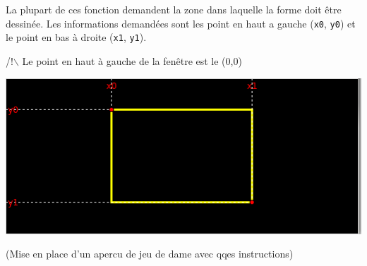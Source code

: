 \documentclass{article}
\begin{document}
La plupart de ces fonction demandent la zone dans laquelle la forme doit être dessinée. Les informations demandées sont les point en haut a gauche (\verb~x0~, \verb~y0~) et le point en bas à droite (\verb~x1~, \verb~y1~).

\noindent
/!$\backslash$ Le point en haut à gauche de la fenêtre est le (0,0)


\includegraphics[width=.9\linewidth]{./img/coord_canvas.png}

(Mise en place d'un apercu de jeu de dame avec qqes instructions)
\end{document}
